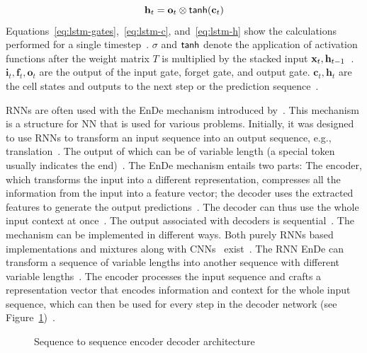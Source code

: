 \begin{equation}\label{eq:lstm-h}
    \textbf{h}_t=\textbf{o}_t\otimes\textsf{tanh}(\textbf{c}_t)
\end{equation}
Equations~\ref{eq:lstm-gates},~\ref{eq:lstm-c}, and~\ref{eq:lstm-h} show the calculations
performed for a single timestep~\citep{xu_show_2016}.
$\sigma$ and $\textsf{tanh}$ denote the application of activation functions after the weight matrix $T$
is multiplied by the stacked input $\textbf{x}_t,\textbf{h}_{t-1}$~\citep{zaremba_recurrent_2015}.
$\textbf{i}_t,\textbf{f}_t,\textbf{o}_t$ are the output of the input gate, forget gate, and output
gate.
$\textbf{c}_t,\textbf{h}_t$ are the cell states and outputs to the next step or the
prediction sequence~\citep{zaremba_recurrent_2015}.

\acp{RNN} are often used with the \ac{EnDe} mechanism introduced by~\cite{cho_learning_2014}.
This mechanism is a structure for \ac{NN} that is used for various problems.
Initially, it was designed to use \acp{RNN} to transform an input sequence into an output sequence,
e.g., translation~\citep{cho_learning_2014}.
The output of which can be of variable length (a special token usually indicates the
end)~\citep{cho_learning_2014,asadi_encoder-decoder_2020}.
The \ac{EnDe} mechanism entails two parts: The encoder, which transforms the input into a
different representation, compresses all the information from the input into a feature vector;
the decoder uses the extracted features to generate the output
predictions~\citep{asadi_encoder-decoder_2020,cho_learning_2014}.
The decoder can thus use the whole input context at once~\citep{asadi_encoder-decoder_2020}.
The output associated with decoders is sequential~\citep{asadi_encoder-decoder_2020}.
The mechanism can be implemented in different ways.
Both purely \acp{RNN} based~\citep{cho_learning_2014} implementations and mixtures along with
\acp{CNN}~\citep{ghosh_visual_2017} exist~\citep{asadi_encoder-decoder_2020}.
The \ac{RNN} \ac{EnDe} can transform a sequence of variable lengths into another
sequence with different variable lengths~\citep{cho_learning_2014}.
The encoder processes the input sequence and crafts a representation vector that encodes information
and context for the whole input sequence, which can then be used for every step in the decoder
network (see Figure~\ref{fig:enc-dec-rnn})~\citep{cho_learning_2014}.
\begin{figure}[h]
    \centering
    \caption[Sequence to sequence encoder decoder architecture]{%
        Sequence to sequence encoder decoder
        architecture~\citep{cho_learning_2014}\label{fig:enc-dec-rnn}
    }
\end{figure}
